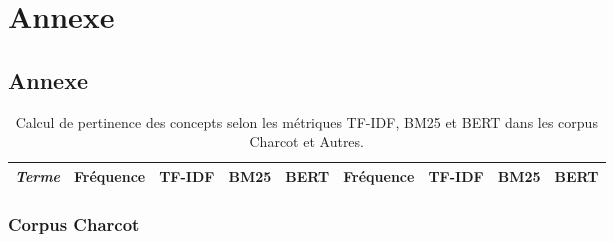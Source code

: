 \part*{Annexe}


\chapter{Annexe}



\makeatletter
\renewcommand{\thesection}{\@arabic\c@section}
\makeatother

\setcounter{section}{0}


\begin{landscape}
\thispagestyle{empty}
\begin{table}[]
\centering
\begin{tabular}{|l|cccc|cccc|}
\hline
\textit{Terme} & Fréquence & \textsc{TF-IDF} & \textsc{BM25} & \textsc{BERT} & Fréquence & \textsc{TF-IDF} & \textsc{BM25} & \textsc{BERT} \\
\hline
\end{tabular}
\caption{Calcul de pertinence des concepts selon les métriques \textsc{TF-IDF}, \textsc{BM25} et \textsc{BERT} dans les corpus \og{}Charcot\fg{} et \og{}Autres\fg{}.}
\end{table}
\vfill
\raisebox{0pt}{\makebox[\linewidth]{\thepage}} %


\label{tab:calculs_stat}
\end{landscape}

\section*{Corpus Charcot}
\begingroup
\renewcommand{\arraystretch}{1.5}  %

